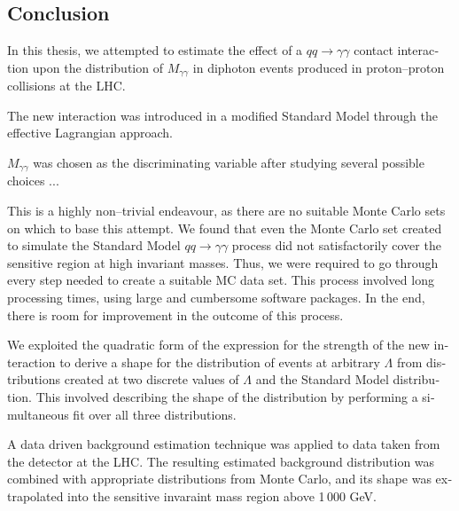 



%


\begin{english}












\chapter{Conclusion}
In this thesis, we attempted to estimate the effect of a $qq\rightarrow\gamma\gamma$ contact interaction upon the distribution of $M_{\gamma\gamma}$ in diphoton events produced in proton--proton collisions at the LHC.

The new interaction was introduced in a modified Standard Model through the effective Lagrangian approach.

$M_{\gamma\gamma}$ was chosen as the discriminating variable after studying several possible choices ...

This is a highly non--trivial endeavour, as there are no suitable \atlas{} Monte Carlo sets on which to base this attempt. We found that even the Monte Carlo set created to simulate the Standard Model $qq\rightarrow\gamma\gamma$ process did not satisfactorily cover the sensitive region at high invariant masses. Thus, we were required to go through every step needed to create a suitable MC data set. This process involved long processing times, using large and cumbersome software packages. In the end, there is room for improvement in the outcome of this process.

We exploited the quadratic form of the expression for the strength of the new interaction to derive a shape for the distribution of events at arbitrary $\Lambda$ from distributions created at two discrete values of $\Lambda$ and the Standard Model distribution. This involved describing the shape of the distribution by performing a simultaneous fit over all three distributions.

A data driven background estimation technique was applied to data taken from the \atlas{} detector at the LHC. The resulting estimated background distribution was combined with appropriate distributions from Monte Carlo, and its shape was extrapolated into the sensitive invaraint mass region above 1\,000 GeV.


\end{english}
